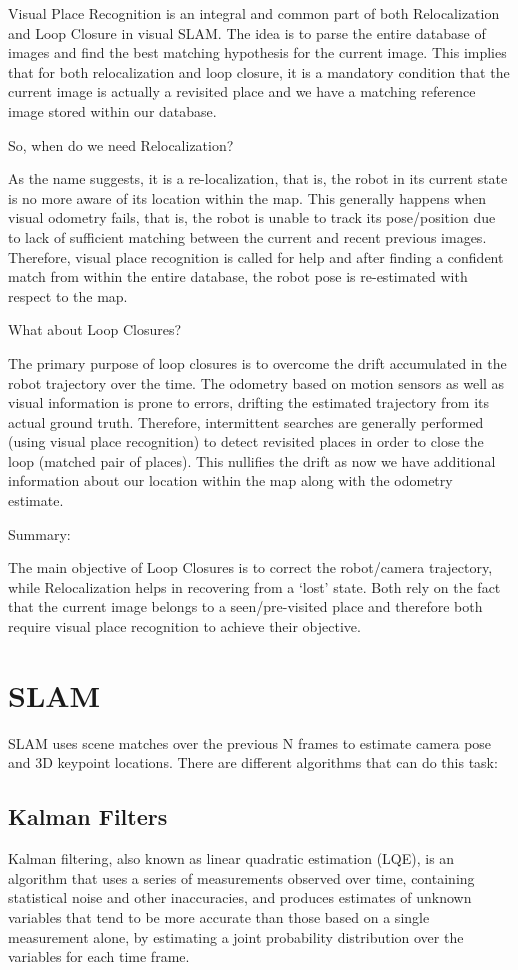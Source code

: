 Visual Place Recognition is an integral and common part of both Relocalization and Loop Closure in visual SLAM. The idea is to parse the entire database of images and find the best matching hypothesis for the current image. This implies that for both relocalization and loop closure, it is a mandatory condition that the current image is actually a revisited place and we have a matching reference image stored within our database.

So, when do we need Relocalization?

As the name suggests, it is a re-localization, that is, the robot in its current state is no more aware of its location within the map. This generally happens when visual odometry fails, that is, the robot is unable to track its pose/position due to lack of sufficient matching between the current and recent previous images. Therefore, visual place recognition is called for help and after finding a confident match from within the entire database, the robot pose is re-estimated with respect to the map.

What about Loop Closures?

The primary purpose of loop closures is to overcome the drift accumulated in the robot trajectory over the time. The odometry based on motion sensors as well as visual information is prone to errors, drifting the estimated trajectory from its actual ground truth. Therefore, intermittent searches are generally performed (using visual place recognition) to detect revisited places in order to close the loop (matched pair of places). This nullifies the drift as now we have additional information about our location within the map along with the odometry estimate.

Summary:

The main objective of Loop Closures is to correct the robot/camera trajectory, while Relocalization helps in recovering from a ‘lost’ state. Both rely on the fact that the current image belongs to a seen/pre-visited place and therefore both require visual place recognition to achieve their objective.


\section{SLAM}

SLAM uses scene matches over the previous N frames to estimate camera pose and 3D keypoint locations. There are different algorithms that can do this task:

\subsection{Kalman Filters}
Kalman filtering, also known as linear quadratic estimation (LQE), is an algorithm that uses a series of measurements observed over time, containing statistical noise and other inaccuracies, and produces estimates of unknown variables that tend to be more accurate than those based on a single measurement alone, by estimating a joint probability distribution over the variables for each time frame.

